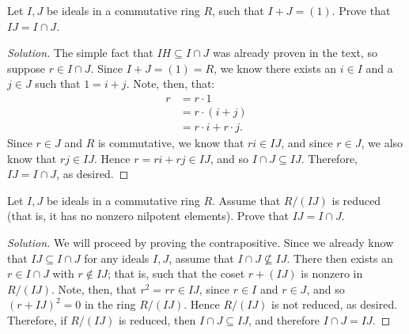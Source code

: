 \documentclass[12pt]{article}
\newenvironment{problem}[2][Problem]{\begin{trivlist}
\item[\hskip \labelsep {\bfseries #1}\hskip \labelsep {\bfseries #2.}]}{\end{trivlist}}
\newenvironment{solution}
  {\renewcommand\qedsymbol{$\blacksquare$}\begin{proof}[Solution]}
{\end{proof}}
\theoremstyle{remark}
\begin{document}
\begin{problem}{4.5}
  Let $I,J$ be ideals in a commutative ring $R$, such that $I+J=(1)$.
  Prove that $IJ=I\cap J$.
\end{problem}
\begin{solution}
  The simple fact that $IH\subseteq I\cap J$ was already proven in the text, so suppose
  $r\in I\cap J$.
  Since $I+J=(1)=R$, we know there exists an $i\in I$ and a $j\in J$ such that $1=i+j$.
  Note, then, that:
  \begin{align*}
    r &= r\cdot1 \\
    &= r\cdot(i+j) \\
    &= r\cdot i + r\cdot j.
  \end{align*}
  Since $r\in J$ and $R$ is commutative, we know that $ri\in IJ$, and since $r\in J$, we also know that
  $rj\in IJ$.
  Hence $r=ri+rj\in IJ$, and so $I\cap J\subseteq IJ$.
  Therefore, $IJ=I\cap J$, as desired.
\end{solution}

\begin{problem}{4.6}
  Let $I,J$ be ideals in a commutative ring $R$.
  Assume that $R/(IJ)$ is reduced (that is, it has no nonzero nilpotent
  elements).
  Prove that $IJ = I\cap J$.
\end{problem}
\begin{solution}
  We will proceed by proving the contrapositive.
  Since we already know that $IJ\subseteq I\cap J$ for any ideals $I,J$,
  assume that $I\cap J\not\subseteq IJ$.
  There then exists an $r\in I\cap J$ with $r\not\in IJ$; that is, 
  such that the coset $r+(IJ)$ is nonzero in $R/(IJ)$.
  Note, then, that $r^2=rr\in IJ$, since $r\in I$ and $r\in J$, and
  so $(r+IJ)^2 = 0$ in the ring $R/(IJ)$.
  Hence $R/(IJ)$ is not reduced, as desired. \\
  \indent Therefore, if $R/(IJ)$ is reduced, then $I\cap J\subseteq IJ$,
  and therefore $I\cap J = IJ$.
\end{solution}
\end{document}
